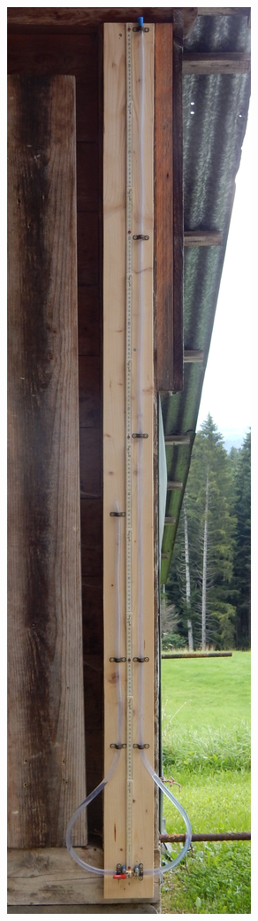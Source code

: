 \documentclass[a4paper,11pt, twocolumn]{article}
\begin{document}
\begin{figure}[h]
\begin{subfigure}{0.22\textwidth}
	\end{subfigure}
	\hfill
	\begin{subfigure}{0.22\textwidth}
		\centering
		\includegraphics[width=\textwidth]{figures/picture_final_cropped.jpg}
	\end{subfigure}
\end{figure}
\end{document}
